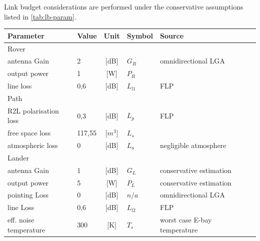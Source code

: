 Link budget considerations are performed under the conservative assumptions listed in \autoref{tab:lb-param}. \\

\begin{table}[h]
\centering
\begin{tabular}{llclll}
\hline
Parameter                        & Value  & Unit	       & Symbol        & Source                       &  \\ \hline
Rover                            &        &            &               &                              &  \\ \hline\hline
antenna Gain           		     & 2      & {[}dB{]}   & ${G}_{R}$  	   & omnidirectional LGA          &  \\
output power        	         & 1      & {[}W{]}    & ${P}_{R}$  	   &                              &  \\
line loss               	     & 0,6    & {[}dB{]}   & ${L}_{l1}$ 	   & FLP                          &  \\ \hline
Path                             &        &            &               &                              &  \\ \hline\hline
R2L polarisation loss            & 0,3    & {[}dB{]}   & ${L}_{p}$ 	   & FLP                          &  \\
free space loss                  & 117,55 & {[}$m^3${]}& ${L}_{s}$  	   &                              &  \\
atmospheric loss                 & 0      & {[}dB{]}   & ${L}_{a}$	   & negligible atmosphere        &  \\ \hline
Lander                           &        &            &               &                              &  \\ \hline\hline
antenna Gain             		 & 1      & {[}dB{]}   & ${G}_{L}$	   & conservative estimation      &  \\
output power        	         & 5      & {[}W{]}    & ${P}_{L}$  	   & conservative estimation      &  \\
pointing Loss  		             & 0      & {[}dB{]}   & ${n/a}$       & omnidirectional LGA          &  \\
line Loss  		                 & 0,6    & {[}dB{]}   & ${L}_{l2}$	   & FLP                          &  \\
eff. noise temperature           & 300    & {[}K{]}    & ${T}_{s}$	   & worst case E-bay temperature &  \\ \hline

\end{tabular}
\end{table}
